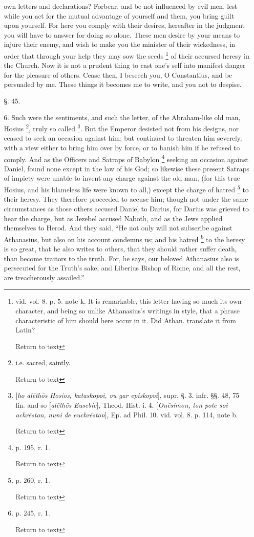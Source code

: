 own letters and declarations? Forbear, and be not influenced by evil
men, lest while you act for the mutual advantage of yourself and them,
you bring guilt upon yourself. For here you comply with their desires,
hereafter in the judgment you will have to answer for doing so alone.
These men desire by your means to injure their enemy, and wish to make
you the minister of their wickedness, in order that through your help
they may sow the seeds \footnote{vid. vol. 8. p. 5. note k. It is remarkable, this letter having so
much its own character, and being so unlike Athanasius's writings in
style, that a phrase characteristic of him should here occur in it.
Did Athan. translate it from Latin?

Return to text} of
their accursed heresy in the Church. Now it is not a prudent thing to
cast one's self into manifest danger for the pleasure of others. Cease
then, I beseech you, O Constantius, and be persuaded by me. These
things it becomes me to write, and you not to despise.

§. 45.

6. Such were the sentiments, and such the letter,
of the Abraham-like old man, Hosius \footnote{i.e. sacred, saintly.

Return to text}, truly so called \footnote{[\emph{ho al\={e}th\={o}s Hosios, kataskopoi, ou gar episkopoi}],
supr. §. 3. infr. §§. 48, 75 fin. and so [\emph{al\={e}th\={o}s
Eusebie}], Theod. Hist. i. 4. [\emph{On\={e}simon, ton pote soi
achr\={e}ston, nuni de euchr\={e}ston}], Ep. ad Phil. 10.
vid. vol. 8. p. 114, note b.

Return to text}.
But the Emperor desisted not from his designs, nor ceased to seek an
occasion against him; but continued to threaten him severely, with a
view either to bring him over by force, or to banish him if he refused
to comply. And as the Officers and Satraps of Babylon \footnote{p. 195, r. 1.

Return to text} seeking an occasion against Daniel, found none except in the
law of his God; so likewise these present Satraps of impiety were
unable to invent any charge against the old man, (for this true
Hosius, and his blameless life were known to all,) except the charge
of hatred \footnote{p. 260, r. 1.

Return to text} to their
heresy. They therefore proceeded to accuse him; though not under the
same circumstances as those others accused Daniel to Darius, for
Darius was grieved to hear the charge, but as Jezebel accused
Naboth, and as the Jews applied themselves to Herod. And they said, ``He
not only will not subscribe against Athanasius, but also on his
account condemns us; and his hatred \footnote{p. 245, r. 1.

Return to text} to the heresy is so great, that he also writes to others, that
they should rather suffer death, than become traitors to the truth.
For, he says, our beloved Athanasius also is persecuted for the Truth's
sake, and Liberius Bishop of Rome, and all the rest, are treacherously
assailed.''

